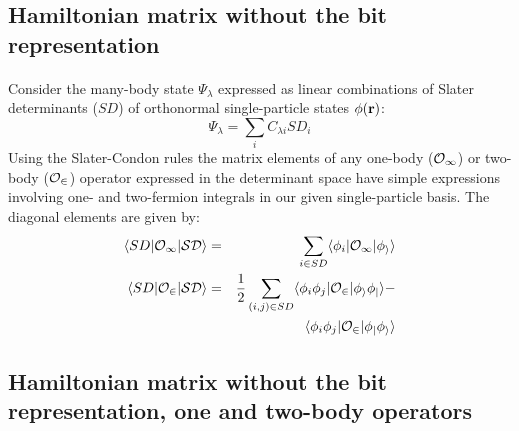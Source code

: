 \documentclass[%
oneside,                 %
final,                   %
10pt]{article}
\begin{document}
\subsection*{Hamiltonian matrix without the bit representation}

\paragraph{}

Consider the many-body state $\Psi_{\lambda}$ expressed as linear combinations of
Slater determinants ($SD$) of orthonormal single-particle states $\phi({\bf r})$:
\begin{equation}
\Psi_{\lambda} = \sum_i C_{\lambda i} SD_i
\end{equation}
Using the Slater-Condon rules the matrix elements of any one-body
($\cal{O}_1$) or two-body ($\cal{O}_2$) operator expressed in the
determinant space have simple expressions involving one- and two-fermion
integrals in our given single-particle basis.
The diagonal elements are given by:
\begin{eqnarray}
  \langle SD | \cal{O}_1 | SD \rangle & = & \sum_{i \in SD} \langle \phi_i | \cal{O}_1 | \phi_i \rangle \\
  \langle SD | \cal{O}_2 | SD \rangle & = & \frac{1}{2} \sum_{(i,j) \in SD}  
      \langle \phi_i \phi_j | \cal{O}_2 | \phi_i \phi_j \rangle - \nonumber \\
 & & 
      \langle \phi_i \phi_j | \cal{O}_2 | \phi_j \phi_i \rangle \nonumber 
\end{eqnarray}



\subsection*{Hamiltonian matrix without the bit representation, one and two-body operators}

\paragraph{}
\end{document}
